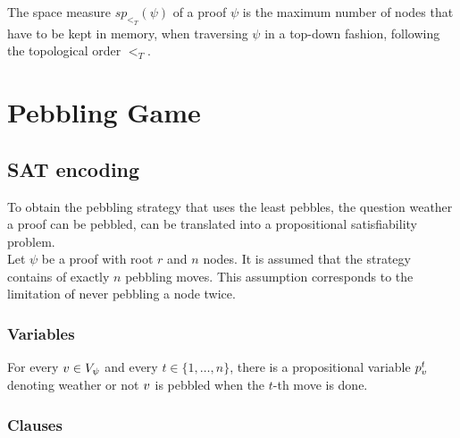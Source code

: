 \documentclass{llncs}
\begin{document}
\begin{definition}
\label{def:space measure}
The space measure $sp_{<_T}(\psi)$ of a proof $\psi$ is the maximum number of nodes that have to be kept in memory, when traversing $\psi$ in a top-down fashion, following the topological order $<_T$.
\end{definition}

\section{Pebbling Game}

\subsection{SAT encoding}

To obtain the pebbling strategy that uses the least pebbles, the question weather a proof can be pebbled, can be translated into a propositional satisfiability problem.\\
Let $\psi$ be a proof with root $r$ and $n$ nodes. It is assumed that the strategy contains of exactly $n$ pebbling moves.
This assumption corresponds to the limitation of never pebbling a node twice.
\subsubsection*{Variables} For every $v \in V_{\psi}$ and every $t \in \{1,\ldots,n\}$, there is a propositional variable $p_{v}^t$ denoting weather or not $v$ is pebbled when the $t$-th move is done.
\subsubsection*{Clauses}
\end{document}
